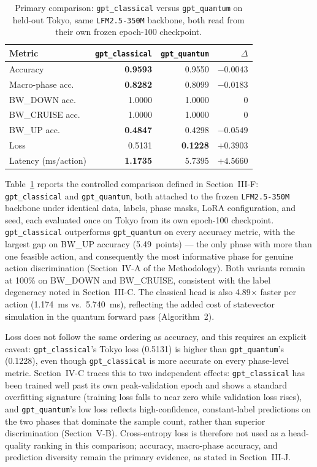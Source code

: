 \begin{table}[!t]
\caption{Primary comparison: \texttt{gpt\_classical} versus \texttt{gpt\_quantum} on held-out Tokyo, same \texttt{LFM2.5-350M} backbone, both read from their own frozen epoch-100 checkpoint.}
\label{tab:primary-comparison}
\centering
\begin{tabular}{lrrr}
\hline
Metric & \texttt{gpt\_classical} & \texttt{gpt\_quantum} & $\Delta$ \\
\hline
Accuracy            & \textbf{0.9593} & 0.9550 & $-0.0043$ \\
Macro-phase acc.     & \textbf{0.8282} & 0.8099 & $-0.0183$ \\
BW\_DOWN acc.        & 1.0000 & 1.0000 & 0 \\
BW\_CRUISE acc.      & 1.0000 & 1.0000 & 0 \\
BW\_UP acc.          & \textbf{0.4847} & 0.4298 & $-0.0549$ \\
Loss                 & 0.5131 & \textbf{0.1228} & $+0.3903$ \\
Latency (ms/action)  & \textbf{1.1735} & 5.7395 & $+4.5660$ \\
\hline
\end{tabular}
\end{table}

Table~\ref{tab:primary-comparison} reports the controlled comparison defined in Section~III-F: \texttt{gpt\_classical} and \texttt{gpt\_quantum}, both attached to the frozen \texttt{LFM2.5-350M} backbone under identical data, labels, phase masks, LoRA configuration, and seed, each evaluated once on Tokyo from its own epoch-100 checkpoint. \texttt{gpt\_classical} outperforms \texttt{gpt\_quantum} on every accuracy metric, with the largest gap on BW\_UP accuracy (5.49~points) --- the only phase with more than one feasible action, and consequently the most informative phase for genuine action discrimination (Section~IV-A of the Methodology). Both variants remain at 100\% on BW\_DOWN and BW\_CRUISE, consistent with the label degeneracy noted in Section~III-C. The classical head is also 4.89$\times$ faster per action (1.174~ms vs.\ 5.740~ms), reflecting the added cost of statevector simulation in the quantum forward pass (Algorithm~2).

Loss does not follow the same ordering as accuracy, and this requires an explicit caveat: \texttt{gpt\_classical}'s Tokyo loss (0.5131) is higher than \texttt{gpt\_quantum}'s (0.1228), even though \texttt{gpt\_classical} is more accurate on every phase-level metric. Section~IV-C traces this to two independent effects: \texttt{gpt\_classical} has been trained well past its own peak-validation epoch and shows a standard overfitting signature (training loss falls to near zero while validation loss rises), and \texttt{gpt\_quantum}'s low loss reflects high-confidence, constant-label predictions on the two phases that dominate the sample count, rather than superior discrimination (Section~V-B). Cross-entropy loss is therefore not used as a head-quality ranking in this comparison; accuracy, macro-phase accuracy, and prediction diversity remain the primary evidence, as stated in Section~III-J.

